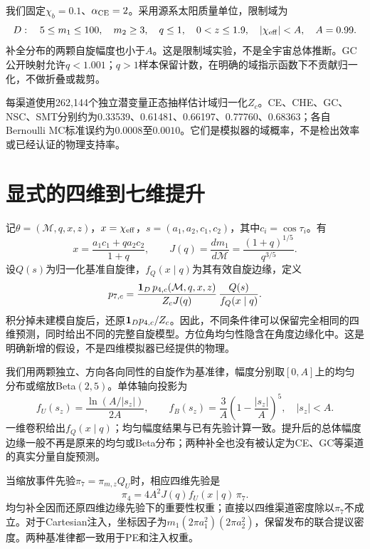我们固定$\chi_b=0.1$、$\alpha_{\rm CE}=2$。采用源系太阳质量单位，限制域为
\begin{equation}\label{eq:domain}
D:\quad 5\le m_1\le100,\quad m_2\ge3,\quad q\le1,\quad0<z\le1.9,\quad |\chi_{\rm eff}|<A,\quad A=0.99.
\end{equation}
补全分布的两颗自旋幅度也小于$A$。这是限制域实验，不是全宇宙总体推断。GC公开映射允许$q<1.001$；$q>1$样本保留计数，在明确的域指示函数下不贡献归一化，不做折叠或裁剪。

每渠道使用262,144个独立潜变量正态抽样估计域归一化$Z_c$。CE、CHE、GC、NSC、SMT分别约为0.33539、0.61481、0.66197、0.77760、0.68363；各自Bernoulli MC标准误约为$0.0008$至$0.0010$。它们是模拟器的域概率，不是检出效率或已经认证的物理支持率。

\section{显式的四维到七维提升}
记$\theta=(\mathcal M,q,x,z)$，$x=\chi_{\rm eff}$，$s=(a_1,a_2,c_1,c_2)$，其中$c_i=\cos\tau_i$。有
\begin{equation}\label{eq:spin}
x=\frac{a_1c_1+q a_2c_2}{1+q},\qquad
J(q)=\frac{d m_1}{d\mathcal M}=\frac{(1+q)^{1/5}}{q^{3/5}}.
\end{equation}
设$Q(s)$为归一化基准自旋律，$f_Q(x\mid q)$为其有效自旋边缘，定义
\begin{equation}\label{eq:lift}
p_{7,c}=\frac{\mathbf{1}_D\,p_{4,c}(\mathcal M,q,x,z)}{Z_c J(q)}\,
\frac{Q(s)}{f_Q(x\mid q)}.
\end{equation}
积分掉未建模自旋后，还原$\mathbf{1}_Dp_{4,c}/Z_c$。因此，不同条件律可以保留完全相同的四维预测，同时给出不同的完整自旋模型。方位角均匀性隐含在角度边缘化中。这是明确新增的假设，不是四维模拟器已经提供的物理。

我们用两颗独立、方向各向同性的自旋作为基准律，幅度分别取$[0,A]$上的均匀分布或缩放Beta$(2,5)$。单体轴向投影为
\begin{equation}\label{eq:axial}
f_U(s_z)=\frac{\ln(A/|s_z|)}{2A},\qquad
f_B(s_z)=\frac{3}{A}\left(1-\frac{|s_z|}{A}\right)^5,\quad |s_z|<A.
\end{equation}
一维卷积给出$f_Q(x\mid q)$；均匀幅度结果与已有先验计算一致\cite{callister}。提升后的总体幅度边缘一般不再是原来的均匀或Beta分布；两种补全也没有被认定为CE、GC等渠道的真实分量自旋预测。

当缩放事件先验$\pi_7=\pi_{m,z}Q_U$时，相应四维先验是
\begin{equation}\label{eq:reduced}
\pi_4=4A^2 J(q) f_U(x\mid q)\,\pi_7.
\end{equation}
均匀补全因而还原四维边缘先验下的重要性权重；直接以四维渠道密度除以$\pi_7$不成立。对于Cartesian注入，坐标因子为$m_1(2\pi a_1^2)(2\pi a_2^2)$，保留发布的联合提议密度。两种基准律都一致用于PE和注入权重。

